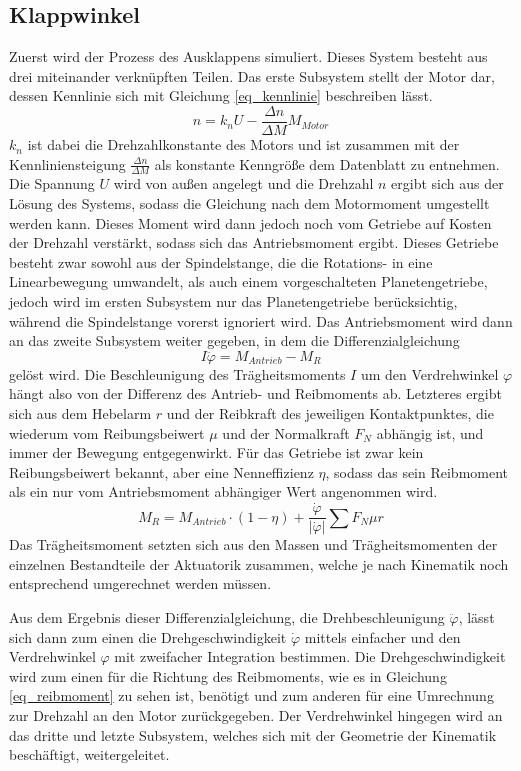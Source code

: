 \subsection{Klappwinkel}
Zuerst wird der Prozess des Ausklappens simuliert. Dieses System besteht aus drei miteinander verknüpften Teilen. Das erste Subsystem stellt der Motor dar, dessen Kennlinie sich mit Gleichung \ref{eq_kennlinie} beschreiben lässt.
\begin{equation}\label{eq_kennlinie}
	n =k_nU-\frac{\Delta n}{\Delta M}M_{Motor}
\end{equation}
$k_n$ ist dabei die Drehzahlkonstante des Motors und ist zusammen mit der Kennliniensteigung $\frac{\Delta n}{\Delta M}$ als konstante Kenngröße dem Datenblatt zu entnehmen. Die Spannung $U$ wird von außen angelegt und die Drehzahl $n$ ergibt sich aus der Lösung des Systems, sodass die Gleichung nach dem Motormoment umgestellt werden kann. Dieses Moment wird dann jedoch noch vom Getriebe auf Kosten der Drehzahl verstärkt, sodass sich das Antriebsmoment ergibt. Dieses Getriebe besteht zwar sowohl aus der Spindelstange, die die Rotations- in eine Linearbewegung umwandelt, als auch einem vorgeschalteten Planetengetriebe, jedoch wird im ersten Subsystem nur das Planetengetriebe berücksichtig, während die Spindelstange vorerst ignoriert wird. Das Antriebsmoment wird dann an das zweite Subsystem weiter gegeben, in dem die Differenzialgleichung
\begin{equation}
	I\ddot{\varphi} = M_{Antrieb} - M_{R}
\end{equation}
gelöst wird. Die Beschleunigung des Trägheitsmoments $I$ um den Verdrehwinkel $\varphi$ hängt also von der Differenz des Antrieb- und Reibmoments ab. Letzteres ergibt sich aus dem Hebelarm $r$ und der Reibkraft des jeweiligen Kontaktpunktes, die wiederum vom Reibungsbeiwert $\mu$ und der Normalkraft $F_N$ abhängig ist, und immer der Bewegung entgegenwirkt. Für das Getriebe ist zwar kein Reibungsbeiwert bekannt, aber eine Nenneffizienz $\eta$, sodass das sein Reibmoment als ein nur vom Antriebsmoment abhängiger Wert angenommen wird.
\begin{equation}\label{eq_reibmoment}
	M_R = M_{Antrieb}\cdot(1-\eta)+\frac{\dot{\varphi}}{|\dot{\varphi}|}\sum F_N \mu r
\end{equation}
Das Trägheitsmoment setzten sich aus den Massen und Trägheitsmomenten der einzelnen Bestandteile der Aktuatorik zusammen, welche je nach Kinematik noch entsprechend umgerechnet werden müssen.

Aus dem Ergebnis dieser Differenzialgleichung, die Drehbeschleunigung $\ddot{\varphi}$, lässt sich dann zum einen die Drehgeschwindigkeit $\dot{\varphi}$ mittels einfacher und den Verdrehwinkel $\varphi$ mit zweifacher Integration bestimmen. Die Drehgeschwindigkeit wird zum einen für die Richtung des Reibmoments, wie es in Gleichung \ref{eq_reibmoment} zu sehen ist, benötigt und zum anderen für eine Umrechnung zur Drehzahl an den Motor zurückgegeben. Der Verdrehwinkel hingegen wird an das dritte und letzte Subsystem, welches sich mit der Geometrie der Kinematik beschäftigt, weitergeleitet.

